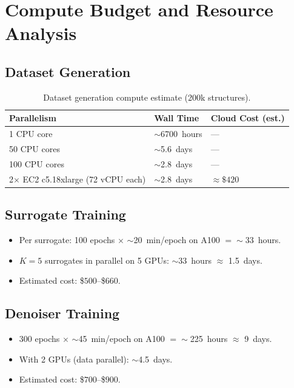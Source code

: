 \documentclass[12pt,a4paper]{article}
\theoremstyle{definition}
\theoremstyle{plain}
\theoremstyle{remark}
\begin{document}
\section{Compute Budget and Resource Analysis}
\label{sec:compute}

\subsection{Dataset Generation}

\begin{table}[H]
\centering
\caption{Dataset generation compute estimate (200k structures).}
\label{tab:compute_data}
\begin{tabular}{lll}
\toprule
\textbf{Parallelism} & \textbf{Wall Time} & \textbf{Cloud Cost (est.)} \\
\midrule
1 CPU core      & $\sim$6700~hours & --- \\
50 CPU cores    & $\sim$5.6~days   & --- \\
100 CPU cores   & $\sim$2.8~days   & --- \\
2$\times$ EC2 c5.18xlarge (72 vCPU each)
                & $\sim$2.8~days   & $\approx\$420$ \\
\bottomrule
\end{tabular}
\end{table}

\subsection{Surrogate Training}

\begin{itemize}
  \item Per surrogate: 100 epochs $\times$ $\sim$20~min/epoch on A100 $= \sim$33~hours.
  \item $K = 5$ surrogates in parallel on 5 GPUs: $\sim$33~hours $\approx$ 1.5~days.
  \item Estimated cost: \$$500$--\$$660$.
\end{itemize}

\subsection{Denoiser Training}

\begin{itemize}
  \item 300 epochs $\times$ $\sim$45~min/epoch on A100 $= \sim$225~hours $\approx$ 9~days.
  \item With 2 GPUs (data parallel): $\sim$4.5~days.
  \item Estimated cost: \$$700$--\$$900$.
\end{itemize}
\end{document}
